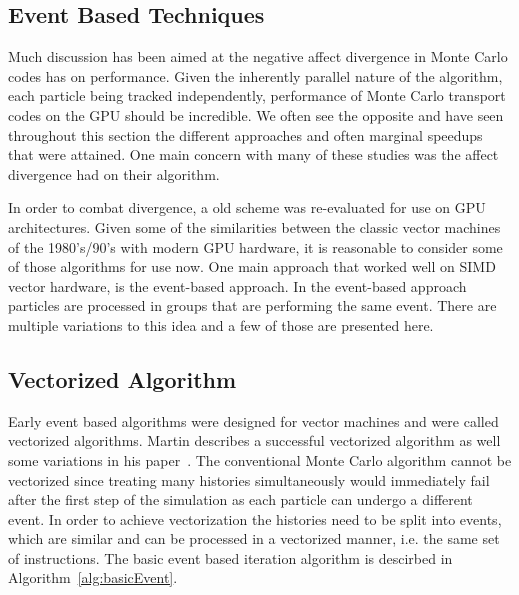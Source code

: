 \subsection{\textbf{Event Based Techniques}}
\label{sec:EventBased}

Much discussion has been aimed at the negative affect divergence in Monte Carlo codes has on  performance.
%
Given the inherently parallel nature of the algorithm, each particle being tracked independently, performance of Monte Carlo transport codes on the GPU should be incredible.
%
We often see the opposite and have seen throughout this section the different approaches and often marginal speedups that were attained.
%
One main concern with many of these studies was the affect divergence had on their algorithm.
%

%
In order to combat divergence, a old scheme was re-evaluated for use on GPU architectures.
%
Given some of the similarities between the classic vector machines of the 1980's/90's with modern GPU hardware, it is reasonable to consider some of those algorithms for use now.
%
One main approach that worked well on SIMD vector hardware, is the event-based approach.
%
In the event-based approach particles are processed in groups that are performing the same event.
%
There are multiple variations to this idea and a few of those are presented here.
%

\subsection*{\textbf{Vectorized Algorithm}}

%
Early event based algorithms were designed for vector machines and were called vectorized algorithms.
%
Martin describes a successful vectorized algorithm as well some variations in his paper~\cite{martin1989successful}.
%
The conventional Monte Carlo algorithm cannot be vectorized since treating many histories simultaneously would immediately fail after the first step of the simulation as each particle can undergo a different event.
%
In order to achieve vectorization the histories need to be split into events, which are similar and can be processed in a vectorized manner, i.e. the same set of instructions.
%
The basic event based iteration algorithm is descirbed in Algorithm~\ref{alg:basicEvent}.
%

